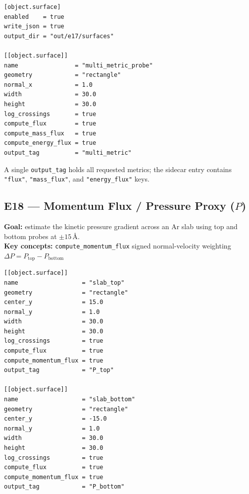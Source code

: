 \documentclass[11pt,a4paper]{article}
\begin{document}
\begin{tcolorbox}[scriptbox, scriptheader,
  title={scripts/e17\_surface\_multi\_metric\_probe.vsim (excerpt)}]
\begin{lstlisting}[style=vsimlst]
[object.surface]
enabled    = true
write_json = true
output_dir = "out/e17/surfaces"

[[object.surface]]
name                = "multi_metric_probe"
geometry            = "rectangle"
normal_x            = 1.0
width               = 30.0
height              = 30.0
log_crossings       = true
compute_flux        = true
compute_mass_flux   = true
compute_energy_flux = true
output_tag          = "multi_metric"
\end{lstlisting}
\end{tcolorbox}

\begin{tcolorbox}[enhanced, colback=vsimcodebg, colframe=vsimrule,
  arc=3pt, boxrule=0.6pt, fonttitle=\sffamily\small\bfseries\color{vsimkw},
  title={Tip}]
\footnotesize
A single \texttt{output\_tag} holds all requested metrics; the sidecar entry
contains \texttt{"flux"}, \texttt{"mass\_flux"}, and \texttt{"energy\_flux"}
keys.
\end{tcolorbox}

\subsection*{E18 --- Momentum Flux / Pressure Proxy ($P$)}

\textbf{Goal:} estimate the kinetic pressure gradient across an Ar slab
using top and bottom probes at $\pm15$\,\AA.\\
\textbf{Key concepts:} \texttt{compute\_momentum\_flux} \textbullet{}
signed normal-velocity weighting \textbullet{} $\Delta P =
P_\mathrm{top} - P_\mathrm{bottom}$

\begin{tcolorbox}[scriptbox, scriptheader,
  title={scripts/e18\_surface\_momentum\_flux.vsim}]
\begin{lstlisting}[style=vsimlst]
[[object.surface]]
name                  = "slab_top"
geometry              = "rectangle"
center_y              = 15.0
normal_y              = 1.0
width                 = 30.0
height                = 30.0
log_crossings         = true
compute_flux          = true
compute_momentum_flux = true
output_tag            = "P_top"

[[object.surface]]
name                  = "slab_bottom"
geometry              = "rectangle"
center_y              = -15.0
normal_y              = 1.0
width                 = 30.0
height                = 30.0
log_crossings         = true
compute_flux          = true
compute_momentum_flux = true
output_tag            = "P_bottom"
\end{lstlisting}
\end{tcolorbox}
\end{document}
